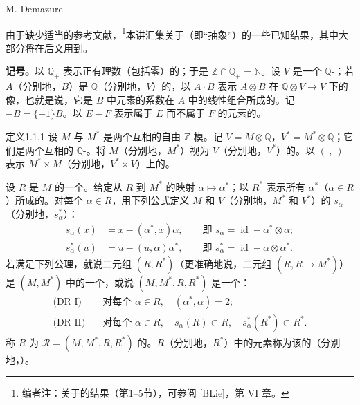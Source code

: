 \begin{center}M. Demazure\end{center}

由于缺少适当的参考文献，\footnote{编者注：关于的结果（第1--5节），可参阅 [BLie]，第 VI 章。}本讲汇集关于（即“抽象”）的一些已知结果，其中大部分将在后文用到。

\textbf{记号。}以 $\mathbb Q_+$ 表示正有理数（包括零）的；于是 $\mathbb Z\cap\mathbb Q_+=\mathbb N$。设 $V$ 是一个 $\mathbb Q$-；若 $A$（分别地，$B$）是 $\mathbb Q$（分别地，$V$）的，以 $A\cdot B$ 表示 $A\otimes B$ 在 $\mathbb Q\otimes V\to V$ 下的像，也就是说，它是 $B$ 中元素的系数在 $A$ 中的线性组合所成的。记 $-B=\{-1\}B$。以 $E-F$ 表示属于 $E$ 而不属于 $F$ 的元素的。

\begin{SGAresult}{定义}{1.1.1}
设 $M$ 与 $M^*$ 是两个互相的自由 $\mathbb Z$-模。记 $V=M\otimes\mathbb Q$，$V^*=M^*\otimes\mathbb Q$；它们是两个互相的 $\mathbb Q$-。将 $M$（分别地，$M^*$）视为 $V$（分别地，$V^*$）的。以 $(\ ,\ )$ 表示 $M^*\times M$（分别地，$V^*\times V$）上的。

设 $R$ 是 $M$ 的一个。给定从 $R$ 到 $M^*$ 的映射 $\alpha\mapsto\alpha^*$；以 $R^*$ 表示所有 $\alpha^*$（$\alpha\in R$）所成的。对每个 $\alpha\in R$，用下列公式定义 $M$ 和 $V$（分别地，$M^*$ 和 $V^*$）的 $s_\alpha$（分别地，$s_\alpha^*$）：
\begin{align}
s_\alpha(x)&=x-(\alpha^*,x)\alpha,\qquad\text{即 }s_\alpha=\operatorname{id}-\alpha^*\otimes\alpha;\tag{1}\\
s_\alpha^*(u)&=u-(u,\alpha)\alpha^*,\qquad\text{即 }s_\alpha^*=\operatorname{id}-\alpha\otimes\alpha^*.\tag{$1^*$}
\end{align}
若满足下列公理，就说二元组 $(R,R^*)$（更准确地说，二元组 $(R,R\to M^*)$）是 $(M,M^*)$ 中的一个，或说 $(M,M^*,R,R^*)$ 是一个：
\begin{align*}
\text{(DR I)}&\quad\text{对每个 }\alpha\in R,\quad (\alpha^*,\alpha)=2;\\
\text{(DR II)}&\quad\text{对每个 }\alpha\in R,\quad s_\alpha(R)\subset R,\quad s_\alpha^*(R^*)\subset R^*.
\end{align*}
称 $R$ 为 $\mathscr R=(M,M^*,R,R^*)$ 的。$R$（分别地，$R^*$）中的元素称为该的（分别地，）。
\end{SGAresult}


